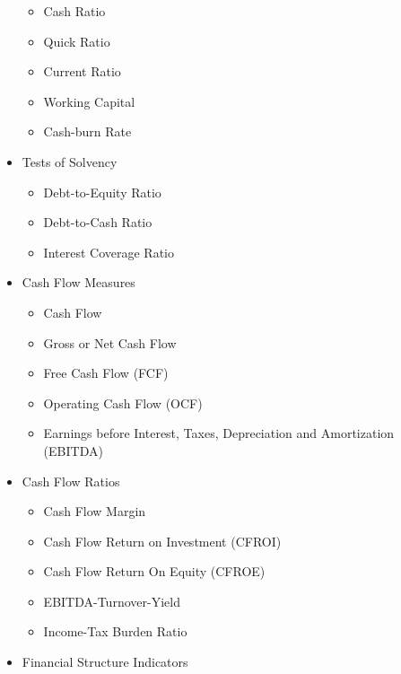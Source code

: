 \documentclass[]{book}
\providecommand{\tightlist}{%
  \setlength{\itemsep}{0pt}\setlength{\parskip}{0pt}}
\begin{document}
\begin{itemize}
  \begin{itemize}
  \tightlist
  \item
    Cash Ratio
  \item
    Quick Ratio
  \item
    Current Ratio
  \item
    Working Capital\\
  \item
    Cash-burn Rate
  \end{itemize}
\item
  Tests of Solvency

  \begin{itemize}
  \tightlist
  \item
    Debt-to-Equity Ratio\\
  \item
    Debt-to-Cash Ratio\\
  \item
    Interest Coverage Ratio
  \end{itemize}
\item
  Cash Flow Measures

  \begin{itemize}
  \tightlist
  \item
    Cash Flow\\
  \item
    Gross or Net Cash Flow\\
  \item
    Free Cash Flow (FCF)\\
  \item
    Operating Cash Flow (OCF)
  \item
    Earnings before Interest, Taxes, Depreciation and Amortization
    (EBITDA)
  \end{itemize}
\item
  Cash Flow Ratios

  \begin{itemize}
  \tightlist
  \item
    Cash Flow Margin\\
  \item
    Cash Flow Return on Investment (CFROI)
  \item
    Cash Flow Return On Equity (CFROE)
  \item
    EBITDA-Turnover-Yield\\
  \item
    Income-Tax Burden Ratio
  \end{itemize}
\item
  Financial Structure Indicators


\end{itemize}
\end{document}
